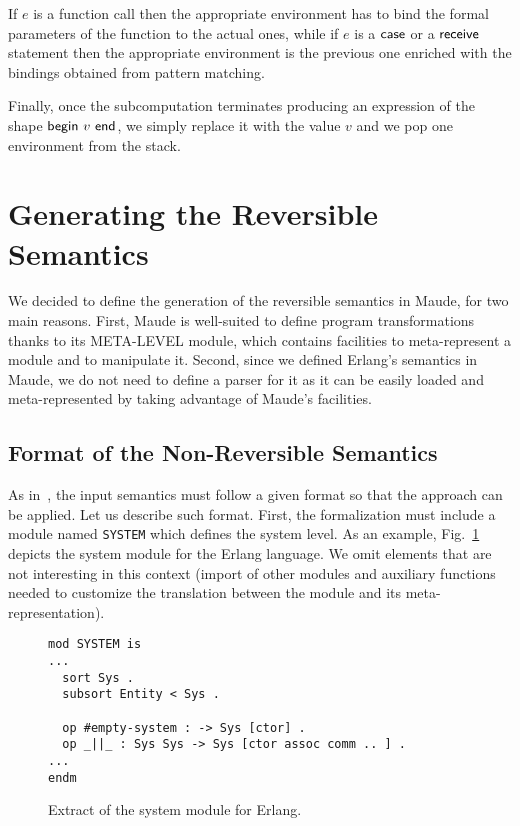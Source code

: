 \documentclass{article}[12pt,a4paper]
\theoremstyle{definition}
\begin{document}
If $e$ is a function call then the
appropriate environment has to bind the formal parameters of
the function to the actual ones, while if $e$ is a $\mathsf{case}$ or a
$\mathsf{receive}$ statement then the appropriate environment is the previous one enriched
with the bindings obtained from pattern matching.

Finally, once the subcomputation terminates producing an expression of the shape $\mathsf{begin}~v~\mathsf{end}$, we simply replace it
with the value $v$ and we pop one environment from the stack. 

\section{Generating the Reversible Semantics}\label{sec:generating}
We decided to define the generation of the reversible semantics in Maude,
for two main reasons. First, Maude is well-suited to define program transformations
thanks to its META-LEVEL module, which contains facilities to meta-represent a
module and to manipulate it. Second, since we defined Erlang's semantics in
Maude, we do not need to define a parser for it as it can
be easily loaded and meta-represented by taking advantage of Maude's facilities.

\subsection{Format of the Non-Reversible Semantics}
As in~\cite{LaneseM20}, the input semantics must follow a given format
so that the approach can be applied.  Let us describe such
format. First, the formalization must include a module named
\verb+SYSTEM+ which defines the system level. As an example,
Fig.~\ref{fig:sem-system} depicts the system module for the Erlang
language. We omit elements that are not interesting in this context
(import of other modules and auxiliary functions needed to customize
the translation between the module and its meta-representation).

\begin{figure}[t]
\begin{Verbatim}
mod SYSTEM is 
...
  sort Sys .
  subsort Entity < Sys .

  op #empty-system : -> Sys [ctor] .
  op _||_ : Sys Sys -> Sys [ctor assoc comm .. ] .
...
endm
\end{Verbatim}
  \caption{Extract of the system module for Erlang.}\label{fig:sem-system}
\end{figure}
\end{document}

